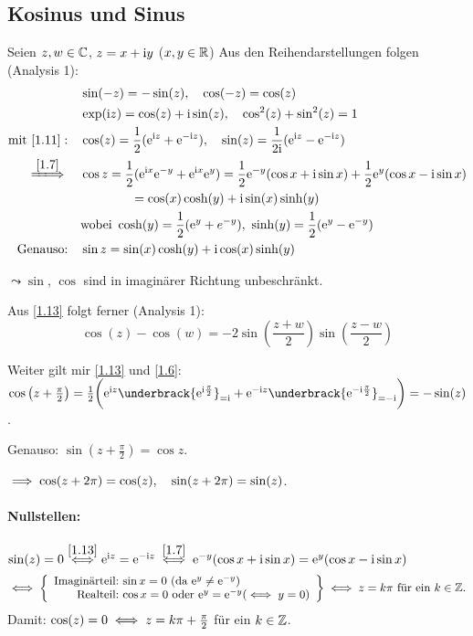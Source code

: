 \documentclass[a4paper,twoside,DIV15,BCOR12mm]{scrbook}
\begin{document}
\subsection{Kosinus und Sinus}

Seien $z,w\in\mathbb{C}$, $z = x +\mathrm{i} y$ ($x,y\in\mathbb{R}$) Aus den Reihendarstellungen folgen (Analysis 1):
\begin{align}
\label{1.11}&\sin(-z) = -\sin(z),\quad \cos(-z) = \cos(z)\\
\label{1.12}&\exp(\i z) = \cos(z)+\i\sin(z),\quad\cos^2(z)+\sin^2(z)=1\\
\label{1.13}\text{mit }\eqref{1.11}:\quad&\cos(z) = \frac{1}{2}(\e^{\i z} + \e^{-\i z}),\quad\sin(z) = \frac{1}{2\i}(\e^{\i z} - \e^{-\i z})\\
\folgtwegen{\eqref{1.7}}\quad&\cos z = \frac{1}{2}(\e^{\i x}\e^{-y}+\e^{\i x}\e^y) = \frac{1}{2}\e^{-y}(\cos x + \i\sin x) + \frac{1}{2}\e^y(\cos x-\i\sin x)\nonumber\\
&\qquad\qquad=\cos(x)\cosh(y)+\i\sin(x)\sinh(y)\label{1.14}\\
&\text{wobei } \cosh(y) = \frac{1}{2}(\e^y+e^{-y}),\ \sinh(y) = \frac{1}{2}(\e^y-\e^{-y})\nonumber\\
\label{1.15}\text{Genauso:}\quad&\sin z = \sin(x)\cosh(y) + \i\cos(x)\sinh(y)
\end{align}

$\leadsto\sin$, $\cos$ sind in imaginärer Richtung unbeschränkt.

Aus \eqref{1.13} folgt ferner (Analysis 1):
\begin{equation}\label{1.16}
\cos(z)-\cos(w) = -2\sin\left(\frac{z+w}{2}\right)\sin\left(\frac{z-w}{2}\right)
\end{equation}

Weiter gilt mir \eqref{1.13} und \eqref{1.6}: $\cos\left(z+\frac{\pi}{2}\right) = \frac{1}{2}\biggl(\e^{\i z}\underbrack{\e^{\i\frac{\pi}{2}}}_{=\i} + \e^{-\i z}\underbrack{\e^{-\i\frac{\pi}{2}}}_{=-\i}\biggr) = -\sin(z)$.

Genauso: $\sin(z+\frac{\pi}{2}) = \cos z$.

$\implies \cos (z+2\pi) = \cos (z),\quad\sin(z+2\pi)= \sin(z)$.

\paragraph{Nullstellen:} $\sin(z) = 0 \stackrel{\eqref{1.13}}{\iff} \mathrm{e}^{\mathrm{i} z} = \mathrm{e}^{-\mathrm{i} z} \stackrel{\eqref{1.7}}{\iff} \mathrm{e}^{-y} (\cos x + \mathrm{i}\sin x) = \mathrm{e}^y (\cos x -\mathrm{i}\sin x)$
\[\gdw \left\{\begin{array}{r @{:\ } l}\text{Imaginärteil}&\sin x = 0\  (\text{da } \e^y\neq\e^{-y})\\\text{Realteil}&\cos x = 0 \text{ oder } \e^y = \e^{-y} (\gdw y=0)\end{array}\right\} \gdw z = k\pi \text{ für ein } k\in\set{Z}.\]
Damit: $\cos(z) = 0\iff z = k\pi+\frac{\pi}{2}$ für ein $k\in\mathbb{Z}$.
\end{document}
